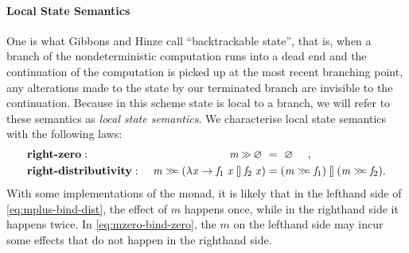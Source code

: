 \documentclass{llncs}
\newcommand{\Varid}[1]{\mathit{#1}}
\let\Varid\mathit
\begin{document}
\paragraph{Local State Semantics}
One is what Gibbons and Hinze call ``backtrackable state'', that is, when a
branch of the nondeterministic computation runs into a dead end and the
continuation of the computation is picked up at the most recent branching point,
any alterations made to the state by our terminated branch are invisible to the
continuation.
Because in this scheme state is local to a branch, we will refer to these
semantics as \emph{local state semantics}.
We characterise local state semantics with the following laws:
\begin{alignat}{2}
&\mbox{\bf right-zero}:~&
  \ensuremath{\Varid{m}\mathbin{\hstretch{0.7}{>\!\!>}}\Varid{\varnothing}}~ &=~ \ensuremath{\Varid{\varnothing}} ~~\mbox{~~,}
    \label{eq:mzero-bind-zero}\\
&\mbox{\bf right-distributivity}:~&
  \ensuremath{\Varid{m}\mathrel{\hstretch{0.7}{>\!\!>\!\!=}}(\lambda \Varid{x}\to \Varid{f}_{1}\;\Varid{x}\mathbin{\talloblong}\Varid{f}_{2}\;\Varid{x})} &= \ensuremath{(\Varid{m}\mathrel{\hstretch{0.7}{>\!\!>\!\!=}}\Varid{f}_{1})\mathbin{\talloblong}(\Varid{m}\mathrel{\hstretch{0.7}{>\!\!>\!\!=}}\Varid{f}_{2})} \mbox{.}
    \label{eq:mplus-bind-dist}
\end{alignat}
With some implementations of the monad, it is likely that in the lefthand side of \eqref{eq:mplus-bind-dist}, the effect of \ensuremath{\Varid{m}} happens once, while in the righthand side it happens twice. In \eqref{eq:mzero-bind-zero}, the \ensuremath{\Varid{m}} on the lefthand side may incur some effects that do not happen in the righthand side.
\end{document}
